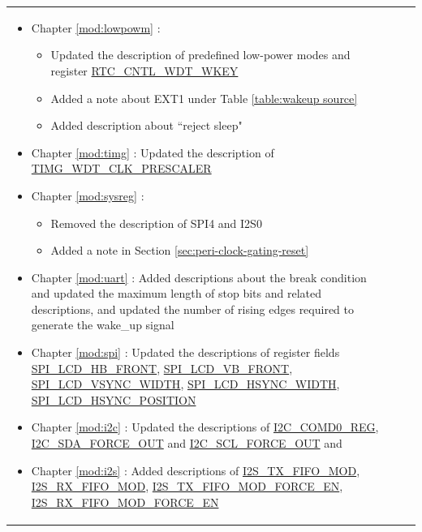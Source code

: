 \begin{longtable}[l]{ | m{2cm} | m{1.5cm} | m{12cm} | }
\begin{itemize}
        \item Chapter \ref{mod:lowpowm} \textit{\nameref{mod:lowpowm}}:
            \begin{itemize}
                \item
                Updated the description of predefined low-power modes and register \hyperref[fielddesc:RTCCNTLWDTWKEY]{RTC\_CNTL\_WDT\_WKEY}%
                \item Added a note about EXT1 under Table \ref{table:wakeup source} %
                \item Added description about ``reject sleep" %
            \end{itemize}
        \item Chapter \ref{mod:timg} \textit{\nameref{mod:timg}}: Updated the description of \hyperref[fielddesc:TIMGWDTCLKPRESCALER]{TIMG\_WDT\_CLK\_PRESCALER} %
        \item Chapter \ref{mod:sysreg} \textit{\nameref{mod:sysreg}}:
        \begin{itemize}
            \item Removed the description of SPI4 and I2S0 %
            \item Added a note in Section \ref{sec:peri-clock-gating-reset} %
        \end{itemize}
        \item Chapter \ref{mod:uart} \textit{\nameref{mod:uart}}: Added descriptions about the break condition and updated the maximum length of stop bits and related descriptions, and updated the number of rising edges required to generate the wake\_up signal %
        \item Chapter \ref{mod:spi} \textit{\nameref{mod:spi}}: Updated the descriptions of register fields \hyperref[fielddesc:SPILCDHBFRONT]{SPI\_LCD\_HB\_FRONT}, \hyperref[fielddesc:SPILCDVBFRONT]{SPI\_LCD\_VB\_FRONT}, \hyperref[fielddesc:SPILCDVSYNCWIDTH]{SPI\_LCD\_VSYNC\_WIDTH}, \hyperref[fielddesc:SPILCDHSYNCWIDTH]{SPI\_LCD\_HSYNC\_WIDTH}, \hyperref[fielddesc:SPILCDHSYNCPOSITION]{SPI\_LCD\_HSYNC\_POSITION} %
        \item Chapter \ref{mod:i2c} \textit{\nameref{mod:i2c}}: Updated the descriptions of \hyperref[regdesc:I2CCOMD0REG]{I2C\_COMD0\_REG}, \hyperref[fielddesc:I2CSDAFORCEOUT]{I2C\_SDA\_FORCE\_OUT} and \hyperref[fielddesc:I2CSCLFORCEOUT]{I2C\_SCL\_FORCE\_OUT} and  %
        \item Chapter \ref{mod:i2s} \textit{\nameref{mod:i2s}}: Added descriptions of \hyperref[fielddesc:I2STXFIFOMOD]{I2S\_TX\_FIFO\_MOD}, \hyperref[fielddesc:I2SRXFIFOMOD]{I2S\_RX\_FIFO\_MOD}, \hyperref[fielddesc:I2STXFIFOMODFORCEEN]{I2S\_TX\_FIFO\_MOD\_FORCE\_EN}, \hyperref[fielddesc:I2SRXFIFOMODFORCEEN]{I2S\_RX\_FIFO\_MOD\_FORCE\_EN} %


\end{itemize}
\end{longtable}
